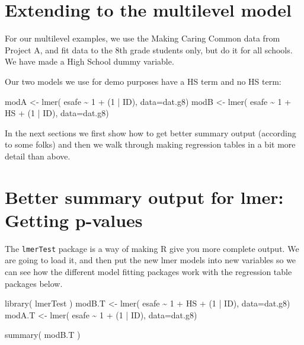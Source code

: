 \documentclass[
  letterpaper,
  DIV=11,
  numbers=noendperiod]{scrreprt}
\newenvironment{Shaded}{\begin{snugshade}}{\end{snugshade}}
\newcommand{\AttributeTok}[1]{\textcolor[rgb]{0.49,0.56,0.16}{#1}}
\newcommand{\DecValTok}[1]{\textcolor[rgb]{0.25,0.63,0.44}{#1}}
\newcommand{\FunctionTok}[1]{\textcolor[rgb]{0.02,0.16,0.49}{#1}}
\newcommand{\NormalTok}[1]{\textcolor[rgb]{0.00,0.44,0.13}{#1}}
\newcommand{\OtherTok}[1]{\textcolor[rgb]{0.00,0.44,0.13}{#1}}
\newcommand{\SpecialCharTok}[1]{\textcolor[rgb]{0.25,0.44,0.63}{#1}}
\begin{document}
\hypertarget{extending-to-the-multilevel-model}{%
\section{Extending to the multilevel
model}\label{extending-to-the-multilevel-model}}

For our multilevel examples, we use the Making Caring Common data from
Project A, and fit data to the 8th grade students only, but do it for
all schools. We have made a High School dummy variable.

Our two models we use for demo purposes have a HS term and no HS term:

\begin{Shaded}
\begin{Highlighting}[]
\NormalTok{modA }\OtherTok{\textless{}{-}} \FunctionTok{lmer}\NormalTok{( esafe }\SpecialCharTok{\textasciitilde{}} \DecValTok{1} \SpecialCharTok{+}\NormalTok{ (}\DecValTok{1} \SpecialCharTok{|}\NormalTok{ ID), }\AttributeTok{data=}\NormalTok{dat.g8)}
\NormalTok{modB }\OtherTok{\textless{}{-}} \FunctionTok{lmer}\NormalTok{( esafe }\SpecialCharTok{\textasciitilde{}} \DecValTok{1} \SpecialCharTok{+}\NormalTok{ HS }\SpecialCharTok{+}\NormalTok{ (}\DecValTok{1} \SpecialCharTok{|}\NormalTok{ ID), }\AttributeTok{data=}\NormalTok{dat.g8)}
\end{Highlighting}
\end{Shaded}

In the next sections we first show how to get better summary output
(according to some folks) and then we walk through making regression
tables in a bit more detail than above.

\hypertarget{better-summary-output-for-lmer-getting-p-values}{%
\section{Better summary output for lmer: Getting
p-values}\label{better-summary-output-for-lmer-getting-p-values}}

The \texttt{lmerTest} package is a way of making R give you more
complete output. We are going to load it, and then put the new lmer
models into new variables so we can see how the different model fitting
packages work with the regression table packages below.

\begin{Shaded}
\begin{Highlighting}[]
\FunctionTok{library}\NormalTok{( lmerTest )}
\NormalTok{modB.T }\OtherTok{\textless{}{-}} \FunctionTok{lmer}\NormalTok{( esafe }\SpecialCharTok{\textasciitilde{}} \DecValTok{1} \SpecialCharTok{+}\NormalTok{ HS }\SpecialCharTok{+}\NormalTok{ (}\DecValTok{1} \SpecialCharTok{|}\NormalTok{ ID), }\AttributeTok{data=}\NormalTok{dat.g8)}
\NormalTok{modA.T }\OtherTok{\textless{}{-}} \FunctionTok{lmer}\NormalTok{( esafe }\SpecialCharTok{\textasciitilde{}} \DecValTok{1} \SpecialCharTok{+}\NormalTok{ (}\DecValTok{1} \SpecialCharTok{|}\NormalTok{ ID), }\AttributeTok{data=}\NormalTok{dat.g8)}

\FunctionTok{summary}\NormalTok{( modB.T )}
\end{Highlighting}
\end{Shaded}
\end{document}
